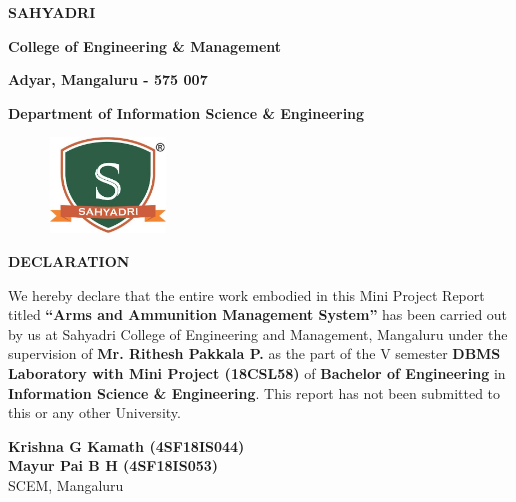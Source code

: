\documentclass[12pt,a4paper]{report}
\begin{document}
\newpage
\begin{center}
{\LARGE \textbf{SAHYADRI}}
\par
\vspace{6pt}
{\Large \textbf{College of Engineering \& Management}}
\par
\vspace{3pt}
{\large \textbf{Adyar, Mangaluru - 575 007}}
\par
\vspace{0.25in}
{\large \textbf{Department of Information Science \& Engineering}}
\par
\begin{figure}[hbtp]
\centering
\includegraphics[width=1.25in,height=1in]{../fig/sahyadri}
\end{figure}
{\Large \textbf{DECLARATION}} 
\end{center}
\par
\vspace{0.10in}
\noindent We hereby declare that the entire work embodied in this Mini Project Report titled
\textbf{``Arms and Ammunition Management System''} has been carried out by us at Sahyadri College of Engineering and Management, Mangaluru under the supervision of \textbf{Mr. Rithesh Pakkala P.} as the part of the V semester \textbf{DBMS Laboratory with Mini Project (18CSL58)} of \textbf{Bachelor of Engineering} in \textbf{Information Science \& Engineering}. This report has not been submitted to this or any other University.\\
\vspace{0.25in}
\begin{flushright}
\textbf{Krishna G Kamath (4SF18IS044)}\\
\textbf{Mayur Pai B H (4SF18IS053)}\\
SCEM, Mangaluru \\
\end{flushright}

\end{document}
